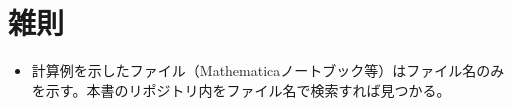 \part{雑則}
    \begin{itemize}
        \item 計算例を示したファイル（Mathematicaノートブック等）はファイル名のみを示す。本書のリポジトリ内をファイル名で検索すれば見つかる。
    \end{itemize}
